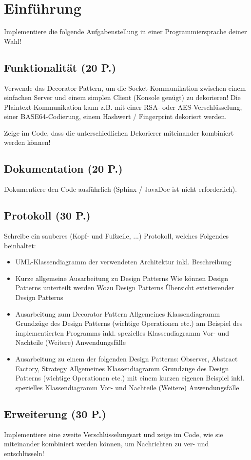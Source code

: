 \section{Einführung}
Implementiere die folgende Aufgabenstellung in einer Programmiersprache deiner Wahl!

\subsection{Funktionalität (20 P.)}

Verwende das Decorator Pattern, um die Socket-Kommunikation zwischen einem einfachen Server und einem simplen Client (Konsole genügt) zu dekorieren! Die Plaintext-Kommunikation kann z.B. mit einer RSA- oder AES-Verschlüsselung, einer BASE64-Codierung, einem Hashwert / Fingerprint dekoriert werden.

Zeige im Code, dass die unterschiedlichen Dekorierer miteinander kombiniert werden können!

\subsection{Dokumentation (20 P.)}

Dokumentiere den Code ausführlich (Sphinx / JavaDoc ist nicht erforderlich).

\subsection{Protokoll (30 P.)}
Schreibe ein sauberes (Kopf- und Fußzeile, ...) Protokoll, welches Folgendes beinhaltet:
\begin{itemize}
	\item UML-Klassendiagramm der verwendeten Architektur inkl. Beschreibung
	\item Kurze allgemeine Ausarbeitung zu Design Patterns
		\subitem Wie können Design Patterns unterteilt werden
		\subitem Wozu Design Patterns
		\subitem Übersicht existierender Design Patterns
	\item Ausarbeitung zum Decorator Pattern
		\subitem Allgemeines Klassendiagramm
		\subitem Grundzüge des Design Patterns (wichtige Operationen etc.) am Beispiel des implementierten Programms inkl. spezielles Klassendiagramm
		\subitem Vor- und Nachteile
		\subitem (Weitere) Anwendungsfälle
	\item Ausarbeitung zu einem der folgenden Design Patterns: Observer, Abstract Factory, Strategy
		\subitem Allgemeines Klassendiagramm
	  	\subitem Grundzüge des Design Patterns (wichtige Operationen etc.) mit einem kurzen eigenen Beispiel inkl. spezielles Klassendiagramm
		\subitem Vor- und Nachteile
		\subitem (Weitere) Anwendungsfälle
\end{itemize}
\subsection{Erweiterung (30 P.)}

Implementiere eine zweite Verschlüsselungsart und zeige im Code, wie sie miteinander kombiniert werden können, um Nachrichten zu ver- und entschlüsseln!
